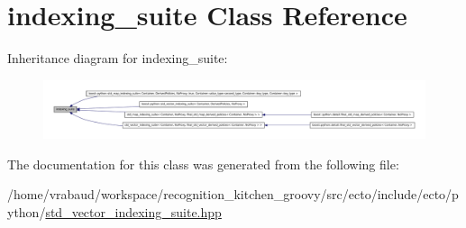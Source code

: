 \hypertarget{classindexing__suite}{\section{indexing\-\_\-suite \-Class \-Reference}
\label{classindexing__suite}
}


\-Inheritance diagram for indexing\-\_\-suite\-:\nopagebreak
\begin{figure}[H]
\begin{center}
\leavevmode
\includegraphics[width=350pt]{classindexing__suite__inherit__graph}
\end{center}
\end{figure}


\-The documentation for this class was generated from the following file\-:\begin{DoxyCompactItemize}
\item 
/home/vrabaud/workspace/recognition\-\_\-kitchen\-\_\-groovy/src/ecto/include/ecto/python/\hyperlink{std__vector__indexing__suite_8hpp}{std\-\_\-vector\-\_\-indexing\-\_\-suite.\-hpp}\end{DoxyCompactItemize}
